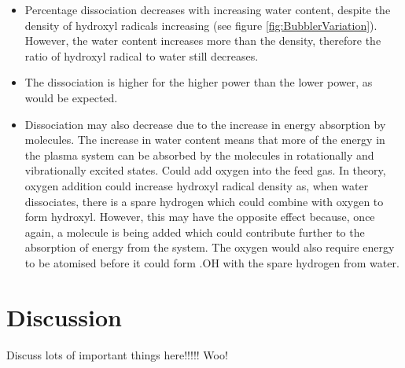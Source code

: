 \documentclass[11pt, oneside]{article}   	%
\begin{document}
\begin{itemize}
    \item Percentage dissociation decreases with increasing water content, despite the density of hydroxyl radicals increasing (see figure \ref{fig:BubblerVariation}). However, the water content increases more than the density, therefore the ratio of hydroxyl radical to water still decreases.
    \item The dissociation is higher for the higher power than the lower power, as would be expected. 
    \item Dissociation may also decrease due to the increase in energy absorption by molecules. The increase in water content means that more of the energy in the plasma system can be absorbed by the molecules in rotationally and vibrationally excited states. Could add oxygen into the feed gas. In theory, oxygen addition could increase hydroxyl radical density as, when water dissociates, there is a spare hydrogen which could combine with oxygen to form hydroxyl. However, this may have the opposite effect because, once again, a molecule is being added which could contribute further to the absorption of energy from the system. The oxygen would also require energy to be atomised before it could form .OH with the spare hydrogen from water.
\end{itemize}




\section{Discussion}

Discuss lots of important things here!!!!! Woo!
\end{document}

